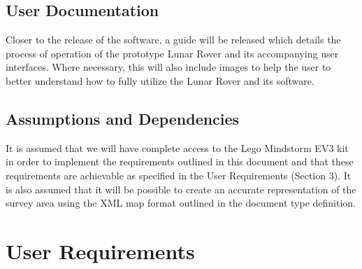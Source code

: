 \documentclass{article}
\begin{document}
\subsection{User Documentation}
\begin{adjustwidth}{1em}{0pt}
Closer to the release of the software, a guide will be released which details the process of operation of the prototype Lunar Rover and its accompanying user interfaces. Where necessary, this will also include images to help the user to better understand how to fully utilize the Lunar Rover and its software.
\end{adjustwidth}
\subsection{Assumptions and Dependencies}
\begin{adjustwidth}{1em}{0pt}
It is assumed that we will have complete access to the Lego Mindstorm EV3 kit in order to implement the requirements outlined in this document and that these requirements are achievable as specified in the User Requirements (Section 3). It is also assumed that it will be possible to create an accurate representation of the survey area using the XML map format outlined in the document type definition.
\end{adjustwidth}
\section{User Requirements}
\end{document}
